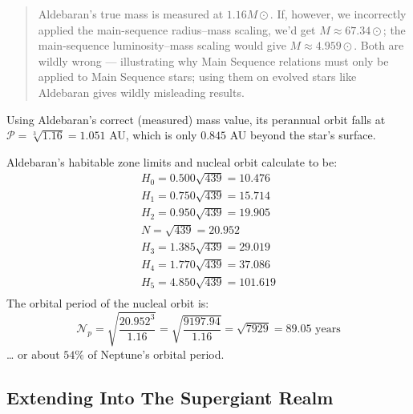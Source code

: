 \documentclass[
  letterpaper,
]{book}
\begin{document}
\begin{quote}
Aldebaran's true mass is measured at \(1.16 M⊙\)\hspace{0pt}. If,
however, we incorrectly applied the main-sequence radius--mass scaling,
we'd get \(M \approx 67.34⊙\)\hspace{0pt}; the main-sequence
luminosity--mass scaling would give \(M \approx 4.959⊙\)\hspace{0pt}.
Both are wildly wrong --- illustrating why Main Sequence relations must
only be applied to Main Sequence stars; using them on evolved stars like
Aldebaran gives wildly misleading results.
\end{quote}

Using Aldebaran's correct (measured) mass value, its perannual orbit
falls at \(\mathcal{P} =\sqrt[3]{1.16} = 1.051\) AU, which is only
\(0.845\) AU beyond the star's surface.

Aldebaran's habitable zone limits and nucleal orbit calculate to be: \[
\begin{align}
H_0 = 0.500\sqrt{439} = 10.476 \\
H_1 = 0.750\sqrt{439} = 15.714 \\
H_2 = 0.950\sqrt{439} = 19.905 \\
N = \sqrt{439} = 20.952 \\
H_3 = 1.385\sqrt{439} = 29.019 \\
H_4 = 1.770\sqrt{439} = 37.086 \\
H_5 = 4.850\sqrt{439} = 101.619 \\
\end{align}
\] The orbital period of the nucleal orbit is: \[
\mathcal{N}_p = \sqrt{\dfrac{20.952^3}{1.16}} = \sqrt{\dfrac{9197.94}{1.16}} = \sqrt{7929} = 89.05 \text{ years}
\] \ldots{} or about \(54\%\) of Neptune's orbital period.

\subsection{Extending Into The Supergiant
Realm}\label{extending-into-the-supergiant-realm}
\end{document}
